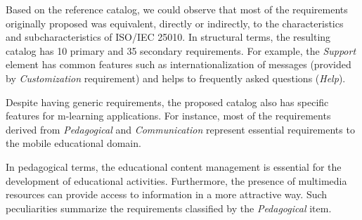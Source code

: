 Based on the reference catalog, we could observe that most of the requirements originally proposed was equivalent, directly or indirectly, to the characteristics and subcharacteristics of ISO/IEC 25010. %
In structural terms, the resulting catalog has 10 primary and 35 secondary requirements. For example, the \textit{Support} element has common features such as internationalization of messages (provided by \textit{Customization} requirement) and helps to frequently asked questions (\textit{Help}).

Despite having generic requirements, the proposed catalog also has specific features for m-learning applications. For instance, most of the requirements derived from \textit{Pedagogical} and \textit{Communication} represent essential requirements to the mobile educational domain.

In pedagogical terms, the educational content management is essential for the development of educational activities. Furthermore, the presence of multimedia resources can provide access to information in a more attractive way. Such peculiarities summarize the requirements classified by the \textit{Pedagogical} item.

